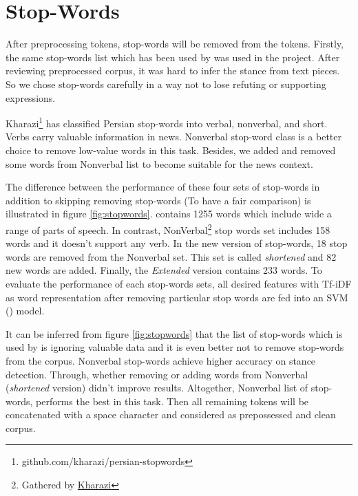 \section{Stop-Words}
After preprocessing tokens, stop-words will be removed from the tokens. Firstly, the same stop-words list which has been used by \cite{stance_persian} was used in the project. After reviewing preprocessed corpus, it was hard to infer the stance from text pieces. So we chose stop-words carefully in a way not to lose refuting or supporting expressions.

Kharazi\footnote{\label{fn:kharazi}github.com/kharazi/persian-stopwords} has classified Persian stop-words into verbal, nonverbal, and short. Verbs carry valuable information in news. Nonverbal stop-word class is a better choice to remove low-value words in this task. Besides, we added and removed some words from Nonverbal list to become suitable for the news context. 


The difference between the performance of these four sets of stop-words in addition to skipping removing stop-words (To have a fair comparison) is illustrated in figure \ref{fig:stopwords}. \cite{stance_persian} contains 1255 words which include wide a range of parts of speech. In contrast, NonVerbal\footnote{Gathered by \href{github.com/kharazi/persian-stopwords}{Kharazi}} stop words set includes 158 words and it doesn't support any verb. In the new version of stop-words, 18 stop words are removed from the Nonverbal set. This set is called \textit{shortened} and 82 new words are added. Finally, the \textit{Extended} version contains 233 words. To evaluate the performance of each stop-words sets, all desired features with Tf-iDF as word representation after removing particular stop words are fed into an SVM (\cite{svc}) model.

It can be inferred from figure \ref{fig:stopwords} that the list of stop-words which is used by \cite{stance_persian} is ignoring valuable data and it is even better not to remove stop-words from the corpus. Nonverbal stop-words achieve higher accuracy on stance detection. Through, whether removing or adding words from Nonverbal (\textit{shortened} version) didn't improve results. Altogether, Nonverbal list of stop-words, performs the best in this task. 
Then all remaining tokens will be concatenated with a space character and considered as prepossessed and clean corpus.

